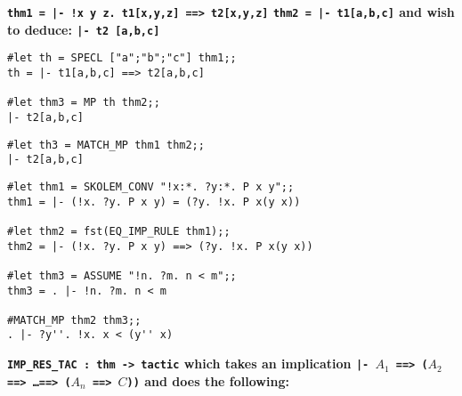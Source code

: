 


\vskip 5mm
\bspindent\Large\bf\obeylines
\verb+thm1 = |- !x y z. t1[x,y,z] ==> t2[x,y,z]+
\mbox{}
\verb!thm2 = |- t1[a,b,c]!
\espindent
\vskip5mm
\bpindent\LARGE\bf
and wish to deduce:
\epindent
\vskip5mm
\bspindent\Large\bf\obeylines
\verb!|- t2 [a,b,c]!
\espindent

\vskip4mm
\begin{session}\begin{verbatim}
#let th = SPECL ["a";"b";"c"] thm1;;
th = |- t1[a,b,c] ==> t2[a,b,c]

#let thm3 = MP th thm2;;
|- t2[a,b,c]
\end{verbatim}\end{session}

\vskip4mm
\begin{session}\begin{verbatim}
#let th3 = MATCH_MP thm1 thm2;;
|- t2[a,b,c]
\end{verbatim}\end{session}


\vskip4mm
\begin{session}\begin{verbatim}
#let thm1 = SKOLEM_CONV "!x:*. ?y:*. P x y";;
thm1 = |- (!x. ?y. P x y) = (?y. !x. P x(y x))

#let thm2 = fst(EQ_IMP_RULE thm1);;
thm2 = |- (!x. ?y. P x y) ==> (?y. !x. P x(y x))

#let thm3 = ASSUME "!n. ?m. n < m";;
thm3 = . |- !n. ?m. n < m

#MATCH_MP thm2 thm3;;
. |- ?y''. !x. x < (y'' x)
\end{verbatim}\end{session}


\vskip 5mm
\bspindent\Large\bf\obeylines
\verb!IMP_RES_TAC : thm -> tactic!
\espindent
\vskip5mm
\bpindent\LARGE\bf
which takes an implication
\epindent
\vskip5mm
\bspindent\Large\bf
{\tt |- $A_1$ ==> ($A_2$ ==> \dots ==> ($A_n$ ==> $C$))}
\espindent
\vskip5mm
\bpindent\LARGE\bf
and does the following:
\epindent
{}

